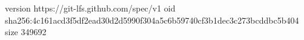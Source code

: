 version https://git-lfs.github.com/spec/v1
oid sha256:4c161acd3f5df2ead30d2d5990f304a5c6b59740cf3b1dec3c273bcddbc5b404
size 349692
